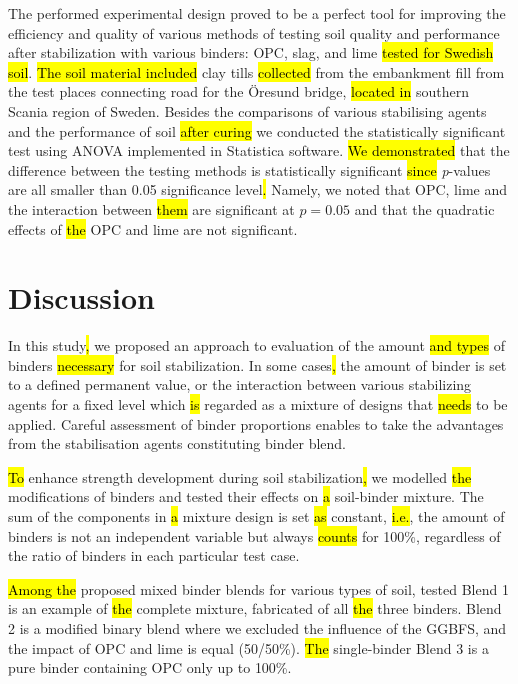 \documentclass[eprint,
]{actapoly}
\begin{document}
The performed experimental design proved to be a perfect tool for improving the efficiency and quality of various methods of testing soil quality and performance after stabilization with various binders: OPC, slag, and lime\hl{ tested for Swedish soil}. \hl{The soil material included }clay tills \hl{collected }from the embankment fill\hl{ }from the test places connecting road for the Öresund bridge, \hl{located in }southern Scania region of Sweden. Besides\hl{ }the\hl{ }comparisons of various stabilising agents and the performance of soil \hl{after curing }we\hl{ }conducted the statistically significant test using\hl{ }ANOVA\hl{ }implemented in Statistica software. \hl{We demonstrated }that the difference between the testing methods is statistically significant \hl{since }\emph{p}-values are all smaller than 0.05 significance level\hl{. }Namely, we noted that OPC, lime and the interaction between \hl{them }are significant at $p = 0.05$ and that the quadratic effects of \hl{the }OPC and lime are not significant.

\section{Discussion}
In this study\hl{, }we proposed an approach to evaluation of the amount \hl{and types }of binders \hl{necessary} for soil stabilization. In some cases\hl{, }the amount of binder is set to a defined permanent value, or the interaction between\hl{ }various stabilizing agents for a fixed level which \hl{is }regarded as a mixture of designs that \hl{needs }to be applied. Careful assessment of binder proportions enables to take the advantages from the stabilisation agents constituting\hl{ }binder blend. 

\hl{To }enhance\hl{ }strength development during soil stabilization\hl{, }we modelled \hl{the }modifications of binders and tested their effects on \hl{a }soil-binder mixture. The sum of the components in \hl{a }mixture design is set \hl{as }constant, \hl{i.e.}, the amount of binders is not an independent variable but always \hl{counts }for 100\%, regardless of the ratio of binders in each particular test case. 

\hl{Among the }proposed mixed binder blends for various types of soil, tested Blend 1 is an example of \hl{the }complete mixture, fabricated of all \hl{the }three\hl{ }binders. Blend 2 is a modified binary blend where we excluded the influence of the GGBFS, and the impact of OPC and lime is equal (50/50\%). \hl{The }single-binder Blend 3 is a pure binder containing OPC only up to 100\%. 
\end{document}
